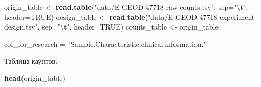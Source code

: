 \documentclass[
]{article}
\newenvironment{Shaded}{\begin{snugshade}}{\end{snugshade}}
\newcommand{\CharTok}[1]{\textcolor[rgb]{0.31,0.60,0.02}{#1}}
\newcommand{\DataTypeTok}[1]{\textcolor[rgb]{0.13,0.29,0.53}{#1}}
\newcommand{\KeywordTok}[1]{\textcolor[rgb]{0.13,0.29,0.53}{\textbf{#1}}}
\newcommand{\NormalTok}[1]{#1}
\newcommand{\OtherTok}[1]{\textcolor[rgb]{0.56,0.35,0.01}{#1}}
\newcommand{\StringTok}[1]{\textcolor[rgb]{0.31,0.60,0.02}{#1}}
\begin{document}
\begin{Shaded}
\begin{Highlighting}[]
\NormalTok{origin_table <-}\StringTok{ }\KeywordTok{read.table}\NormalTok{(}\StringTok{"data/E-GEOD-47718-raw-counts.tsv"}\NormalTok{, }\DataTypeTok{sep=}\StringTok{"}\CharTok{\textbackslash{}t}\StringTok{"}\NormalTok{, }\DataTypeTok{header=}\OtherTok{TRUE}\NormalTok{)}
\NormalTok{design_table <-}\StringTok{ }\KeywordTok{read.table}\NormalTok{(}\StringTok{"data/E-GEOD-47718-experiment-design.tsv"}\NormalTok{, }\DataTypeTok{sep=}\StringTok{"}\CharTok{\textbackslash{}t}\StringTok{"}\NormalTok{, }\DataTypeTok{header=}\OtherTok{TRUE}\NormalTok{)}
\NormalTok{counts_table <-}\StringTok{ }\NormalTok{origin_table}

\NormalTok{col_for_research =}\StringTok{ "Sample.Characteristic.clinical.information."}
\end{Highlighting}
\end{Shaded}

Таблица каунтов:

\begin{Shaded}
\begin{Highlighting}[]
\KeywordTok{head}\NormalTok{(origin_table)}
\end{Highlighting}
\end{Shaded}
\end{document}
